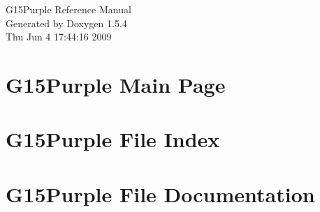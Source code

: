 \documentclass[a4paper]{book}
\begin{document}
\begin{titlepage}
\vspace*{7cm}
\begin{center}
{\Large G15Purple Reference Manual}\\
\vspace*{1cm}
{\large Generated by Doxygen 1.5.4}\\
\vspace*{0.5cm}
{\small Thu Jun 4 17:44:16 2009}\\
\end{center}
\end{titlepage}
\clearemptydoublepage
{}
\tableofcontents
\clearemptydoublepage
{}
\chapter{G15Purple Main Page}
\label{index}
\chapter{G15Purple File Index}

\chapter{G15Purple File Documentation}


\printindex
\end{document}

